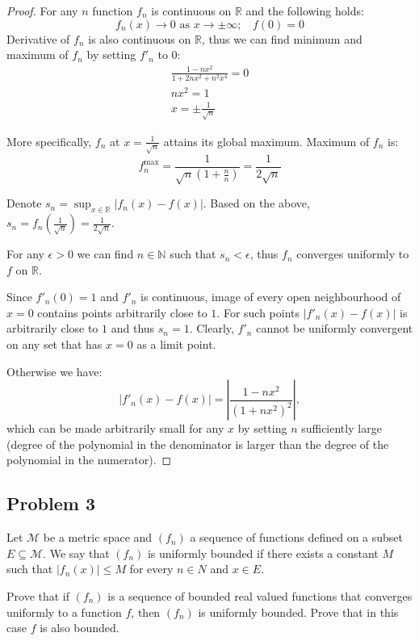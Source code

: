 \documentclass{article}
\newcommand{\R}{\mathbb{R}}
\newcommand{\N}{\mathbb{N}}
\begin{document}
\begin{proof}

For any $n$ function $f_n$ is continuous  on $\R$ and the following holds:
\[ f_n(x) \to 0 \text{ as } x \to \pm \infty; \>\>\>\> f(0) = 0 \]
Derivative of $f_n$ is also continuous on $\R$, thus we can find minimum and maximum of $f_n$ by setting $f'_n$ to $0$:
\begin{gather*}
    \frac{1-nx^2}{1+2nx^2+n^2x^4} = 0 \\
    nx^2 = 1 \\
    x = \pm \frac{1}{\sqrt{n}}
\end{gather*}

More specifically, $f_n$ at $x=\frac{1}{\sqrt{n}}$ attains its global maximum.
Maximum of $f_n$ is:
\[ f^{\text{max}}_n = \frac{1}{\sqrt{n}(1+\frac{n}{n})} = \frac{1}{2\sqrt{n}} \]

Denote $s_n = \sup_{x\in\R} |f_n(x)-f(x)|$.
Based on the above, $s_n = f_n \left( \frac{1}{\sqrt{n}} \right) = \frac{1}{2\sqrt{n}}$.

For any $\epsilon>0$ we can find $n\in\N$ such that $s_n < \epsilon$, thus $f_n$ converges uniformly to $f$ on $\R$.

Since $f'_n(0)=1$ and $f'_n$ is continuous, image of every open neighbourhood of $x=0$ contains points arbitrarily close to $1$.
For such points $|f'_n(x)-f(x)|$ is arbitrarily close to $1$ and thus $s_n = 1$.
Clearly, $f'_n$ cannot be uniformly convergent on any set that has $x=0$ as a limit point.

Otherwise we have:
\[ | f'_n(x) - f(x) | = \left| \frac{1-nx^2}{(1+nx^2)^2} \right|, \]
which can be made arbitrarily small for any $x$ by setting $n$ sufficiently large (degree of the polynomial in the denominator is larger than the degree of the polynomial in the numerator).

\end{proof}


\subsection*{Problem 3}

\begin{tcolorbox}
Let $\mathcal{M}$ be a metric space and $(f_n)$ a sequence of functions defined on a subset $E \subseteq \mathcal{M}$.
We say that $(f_n)$ is uniformly bounded if there exists a constant $M$ such that $|f_n (x)| \leq M$ for every $n \in N$ and $x \in E$.

Prove that if $(f_n)$ is a sequence of bounded real valued functions that converges uniformly to a function $f$, then $(f_n)$ is uniformly bounded.
Prove that in this case $f$ is also bounded.
\end{tcolorbox}
\end{document}
